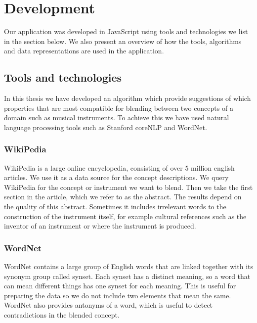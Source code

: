
\chapter{Development} %

\label{Chapter4} %


Our application was developed in JavaScript using tools and technologies we list in the section below. We also present an overview of how the tools, algorithms and data representations are used in the application.
\section{Tools and technologies}
In this thesis we have developed an algorithm which provide suggestions of which properties that are most compatible for blending between two concepts of a domain such as musical instruments. To achieve this we have used natural language processing tools such as Stanford coreNLP and WordNet.

\subsection{WikiPedia}
WikiPedia is a large online encyclopedia, consisting of over 5 million english articles. We use it as a data source for the concept descriptions. We query WikiPedia for the concept or instrument we want to blend. Then we take the first section in the article, which we refer to as the abstract. The results depend on the quality of this abstract. Sometimes it includes irrelevant words to the construction of the instrument itself, for example cultural references such as the inventor of an instrument or where the instrument is produced.

\subsection{WordNet}
WordNet contains a large group of English words that are linked together with its synonym group called synset. Each synset has a distinct meaning, so a word that can mean different things has one synset for each meaning. This is useful for preparing the data so we do not include two elements that mean the same. WordNet also provides antonyms of a word, which is useful to detect contradictions in the blended concept.

